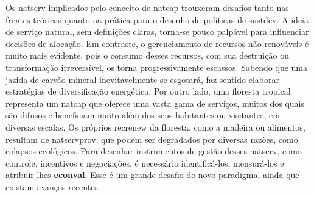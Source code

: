 \documentclass[./main.tex]{subfiles}
\begin{document}
\par Os \gls{natserv} implicados pelo conceito de \gls{natcap} trouxeram desafios tanto nas frentes teóricas quanto na prática para o desenho de políticas de \gls{sustdev}. A ideia de serviço natural, sem definições claras, torna-se pouco palpável para influenciar decisões de alocação. Em contraste, o gerenciamento de recursos não-renováveis é muito mais evidente, pois o consumo desses recursos, com sua destruição ou transformação irreversível, os torna progressivamente escassos. Sabendo que uma jazida de carvão mineral inevitavelmente se esgotará, faz sentido elaborar estratégias de diversificação energética. Por outro lado, uma floresta tropical representa um \gls{natcap} que oferece uma vasta gama de serviços, muitos dos quais são difusos e beneficiam muito além dos seus habitantes ou visitantes, em diversas escalas. Os próprios \gls{recrenew} da floresta, como a madeira ou alimentos, resultam de \gls{natservprov}, que podem ser degradados por diversas razões, como colapsos ecológicos. Para desenhar instrumentos de gestão desses \gls{natserv}, como controle, incentivos e negociações, é necessário identificá-los, mensurá-los e atribuir-lhes \textbf{\gls{econval}}. Esse é um grande desafio do novo \gls{paradigma}, ainda que existam avanços recentes.
\end{document}
